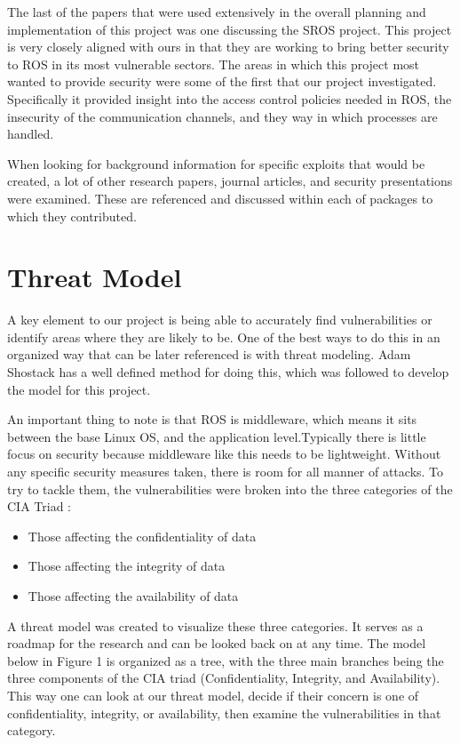 \documentclass[IEEEtran,letterpaper,10pt,notitlepage,draftclsnofoot]{article}
\begin{document}
The last of the papers that were used extensively in the overall planning and implementation of this project was one discussing the SROS project.
This project is very closely aligned with ours in that they are working to bring better security to ROS in its most vulnerable sectors.
The areas in which this project most wanted to provide security were some of the first that our project investigated. 
Specifically it provided insight into the access control policies needed in ROS, the insecurity of the communication channels, and they way in which processes are handled. \cite{Sros}

When looking for background information for specific exploits that would be created, a lot of other research papers, journal articles, and security presentations were examined.
These are referenced and discussed within each of packages to which they contributed.

\section{Threat Model}
A key element to our project is being able to accurately find vulnerabilities or identify areas where they are likely to be.
One of the best ways to do this in an organized way that can be later referenced is with threat modeling.
Adam Shostack has a well defined method for doing this, which was followed to develop the model for this project. \cite{TMDS}

An important thing to note is that ROS is middleware, which means it sits between the base Linux OS, and the application level.Typically there is little focus on security because middleware like this needs to be lightweight. 
Without any specific security measures taken, there is room for all manner of attacks. To try to tackle them, the vulnerabilities were broken into the three categories of the CIA Triad \cite{CIA}:
\begin{itemize}
  \item Those affecting the confidentiality of data
  \item Those affecting the integrity of data
  \item Those affecting the availability of data
\end{itemize}

A threat model was created to visualize these three categories. It serves as a roadmap for the research and can be looked back on at any time.
The model below in Figure 1 is organized as a tree, with the three main branches being the three components of the CIA triad (Confidentiality, Integrity, and Availability).
This way one can look at our threat model, decide if their concern is one of confidentiality, integrity, or availability, then examine the vulnerabilities in that category.
\end{document}
